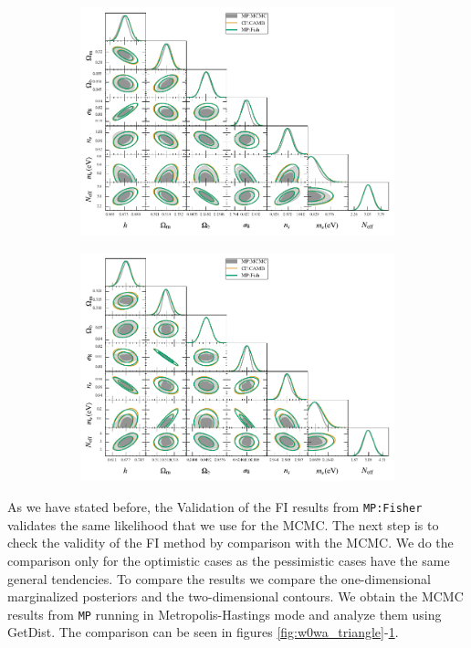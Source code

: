 \documentclass[oneside]{book}
\newcommand*{\montepython}{\texttt{MP}\xspace}
\newcommand*{\montefisher}{\texttt{MP:Fisher}\xspace}
\newcommand*{\neff}{N_\mathrm{eff}}
\begin{document}
\begin{figure}
    \centering
    \caption{Same as figure \ref{fig:w0wa_triangle} but for the $\Lambda$CDM+$m_\nu+\neff$ model.}
    \begin{subfigure}[b]{0.49\textwidth}
        \centering
        \includegraphics[width=\textwidth]{S_MN_validation.pdf}
    \end{subfigure}
    \hfill
    \begin{subfigure}[b]{0.49\textwidth}
        \centering
        \includegraphics[width=\textwidth]{P_MN_validation.pdf}
    \end{subfigure}
       \label{fig:MN_triangle} 
\end{figure}
As we have stated before, the Validation of the FI results from \montefisher validates the same likelihood that we use for the MCMC. The next step is to check the validity of the FI method by comparison with the MCMC. We do the comparison only for the optimistic cases as the pessimistic cases have the same general tendencies. To compare the results we compare the one-dimensional marginalized posteriors and the two-dimensional contours. We obtain the MCMC results from \montepython running in Metropolis-Hastings mode and analyze them using GetDist. The comparison can be seen in figures \ref{fig:w0wa_triangle}-\ref{fig:MN_triangle}.\\
\end{document}
